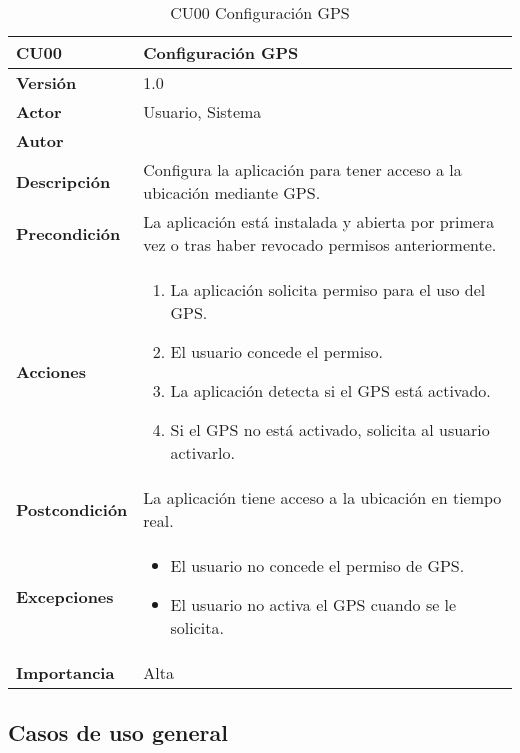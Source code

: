 \begin{table}[p]
	\centering
	\begin{tabularx}{\linewidth}{ p{} p{} }
		\toprule
		\textbf{CU00}    & \textbf{Configuración GPS} \\
		\toprule
		\textbf{Versión}              & 1.0    \\
		\textbf{Actor}                & Usuario, Sistema \\
		\textbf{Autor}                & \autor \\
		\textbf{Descripción}          & Configura la aplicación para tener acceso a la ubicación mediante GPS. \\
		\textbf{Precondición}         & La aplicación está instalada y abierta por primera vez o tras haber revocado permisos anteriormente. \\
		\textbf{Acciones}             &
		\begin{enumerate}
			\def\labelenumi{\arabic{enumi}.}
			\tightlist
			\item La aplicación solicita permiso para el uso del GPS.
			\item El usuario concede el permiso.
			\item La aplicación detecta si el GPS está activado.
			\item Si el GPS no está activado, solicita al usuario activarlo.
		\end{enumerate}\\
		\textbf{Postcondición}        & La aplicación tiene acceso a la ubicación en tiempo real. \\
		\textbf{Excepciones}          & 
		\begin{itemize}
			\tightlist
			\item El usuario no concede el permiso de GPS.
			\item El usuario no activa el GPS cuando se le solicita.
		\end{itemize}\\
		\textbf{Importancia}          & Alta \\
		\bottomrule
	\end{tabularx}
	\caption{CU00 Configuración GPS}
\end{table}

\FloatBarrier

\subsection{Casos de uso general}

